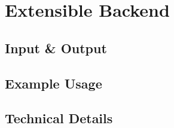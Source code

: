 \section{Extensible Backend}
\subsection{Input \& Output}

\subsection{Example Usage}

\subsection{Technical Details}

\newpage
